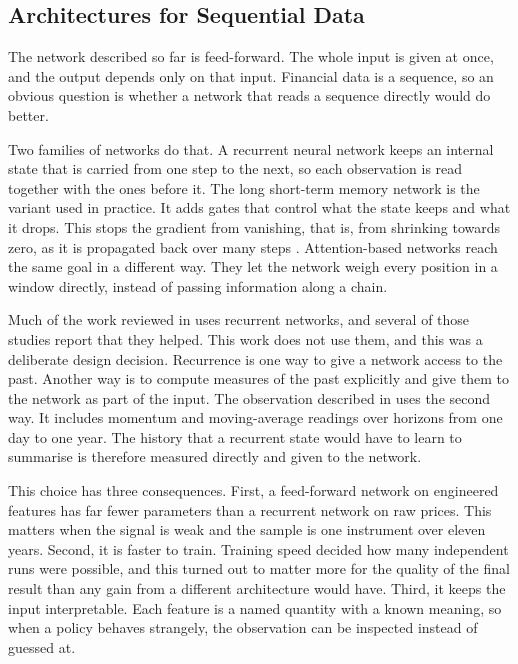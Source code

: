 \subsection{Architectures for Sequential Data}

The network described so far is feed-forward. The whole input is given at once, and the output depends only on that input. Financial data is a sequence, so an obvious question is whether a network that reads a sequence directly would do better.

Two families of networks do that. A recurrent neural network keeps an internal state that is carried from one step to the next, so each observation is read together with the ones before it. The long short-term memory network is the variant used in practice. It adds gates that control what the state keeps and what it drops. This stops the gradient from vanishing, that is, from shrinking towards zero, as it is propagated back over many steps \cite{goodfellow_deep_2016}. Attention-based networks reach the same goal in a different way. They let the network weigh every position in a window directly, instead of passing information along a chain.

Much of the work reviewed in  uses recurrent networks, and several of those studies report that they helped. This work does not use them, and this was a deliberate design decision. Recurrence is one way to give a network access to the past. Another way is to compute measures of the past explicitly and give them to the network as part of the input. The observation described in  uses the second way. It includes momentum and moving-average readings over horizons from one day to one year. The history that a recurrent state would have to learn to summarise is therefore measured directly and given to the network.

This choice has three consequences. First, a feed-forward network on engineered features has far fewer parameters than a recurrent network on raw prices. This matters when the signal is weak and the sample is one instrument over eleven years. Second, it is faster to train. Training speed decided how many independent runs were possible, and this turned out to matter more for the quality of the final result than any gain from a different architecture would have. Third, it keeps the input interpretable. Each feature is a named quantity with a known meaning, so when a policy behaves strangely, the observation can be inspected instead of guessed at.

